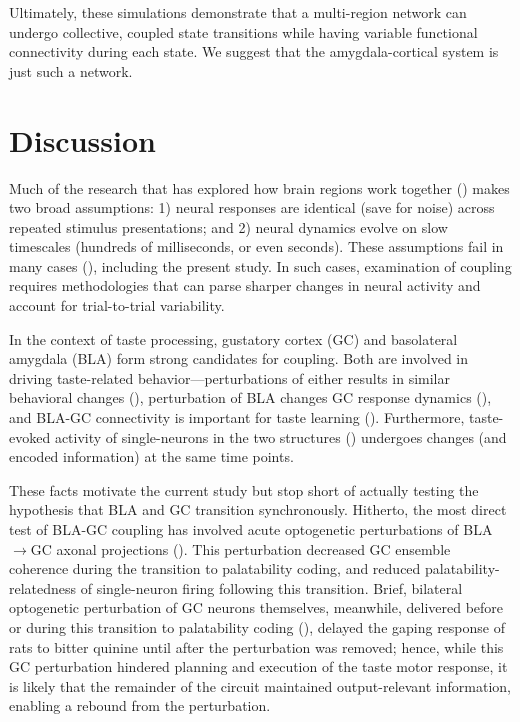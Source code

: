 \begin{refsection}
Ultimately, these simulations demonstrate that a multi-region network can undergo collective, coupled state transitions while having variable functional connectivity during each state. We suggest that the amygdala-cortical system is just such a network.

\section{Discussion}
Much of the research that has explored how brain regions work together (\cite{markov2014a,grabska-barwi2017a,yates2017a,glaser2018a}) makes two broad assumptions: 1) neural responses are identical (save for noise) across repeated stimulus presentations; and 2) neural dynamics evolve on slow timescales (hundreds of milliseconds, or even seconds). These assumptions fail in many cases (\cite{gat1997a,sugase1999a,latimer2015a,jones2007a}), including the present study. In such cases, examination of coupling requires methodologies that can parse sharper changes in neural activity and account for trial-to-trial variability.

In the context of taste processing, gustatory cortex (GC) and basolateral amygdala (BLA) form strong candidates for coupling. Both are involved in driving taste-related behavior—perturbations of either results in similar behavioral changes (\cite{lovaglio2010a,lin2011a,lin2018a}), perturbation of BLA changes GC response dynamics (\cite{piette2012a}), and BLA-GC connectivity is important for taste learning (\cite{lin2012a}). Furthermore, taste-evoked activity of single-neurons in the two structures (\cite{fontanini2009a,sadacca2012a}) undergoes changes (and encoded information) at the same time points. 

These facts motivate the current study but stop short of actually testing the hypothesis that BLA and GC transition synchronously. Hitherto, the most direct test of BLA-GC coupling has involved acute optogenetic perturbations of BLA$\rightarrow$GC axonal projections (\cite{lin2021a}). This perturbation decreased GC ensemble coherence during the transition to palatability coding, and reduced palatability-relatedness of single-neuron firing following this transition. Brief, bilateral optogenetic perturbation of GC neurons themselves, meanwhile, delivered before or during this transition to palatability coding (\cite{mukherjee2019a}), delayed the gaping response of rats to bitter quinine until after the perturbation was removed; hence, while this GC perturbation hindered planning and execution of the taste motor response, it is likely that the remainder of the circuit maintained output-relevant information, enabling a rebound from the perturbation. 


\end{refsection}
